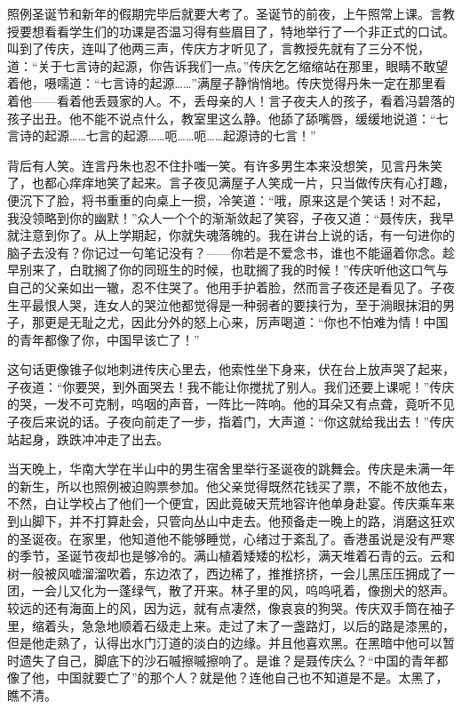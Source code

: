 \documentclass[UTF8]{ctexart}
\begin{document}
照例圣诞节和新年的假期完毕后就要大考了。圣诞节的前夜，上午照常上课。言教授要想看看学生们的功课是否温习得有些眉目了，特地举行了一个非正式的口试。叫到了传庆，连叫了他两三声，传庆方才听见了，言教授先就有了三分不悦，道：“关于七言诗的起源，你告诉我们一点。”传庆乞乞缩缩站在那里，眼睛不敢望着他，嗫嚅道：“七言诗的起源……”满屋子静悄悄地。传庆觉得丹朱一定在那里看着他——看着他丢聂家的人。不，丢母亲的人！言子夜夫人的孩子，看着冯碧落的孩子出丑。他不能不说点什么，教室里这么静。他舔了舔嘴唇，缓缓地说道：“七言诗的起源……七言的起源……呃……呃……起源诗的七言！”

背后有人笑。连言丹朱也忍不住扑嗤一笑。有许多男生本来没想笑，见言丹朱笑了，也都心痒痒地笑了起来。言子夜见满屋子人笑成一片，只当做传庆有心打趣，便沉下了脸，将书重重的向桌上一掼，冷笑道：“哦，原来这是个笑话！对不起，我没领略到你的幽默！”众人一个个的渐渐敛起了笑容，子夜又道：“聂传庆，我早就注意到你了。从上学期起，你就失魂落魄的。我在讲台上说的话，有一句进你的脑子去没有？你记过一句笔记没有？——你若是不爱念书，谁也不能逼着你念。趁早别来了，白耽搁了你的同班生的时候，也耽搁了我的时候！”传庆听他这口气与自己的父亲如出一辙，忍不住哭了。他用手护着脸，然而言子夜还是看见了。子夜生平最恨人哭，连女人的哭泣他都觉得是一种弱者的要挟行为，至于淌眼抹泪的男子，那更是无耻之尤，因此分外的怒上心来，厉声喝道：“你也不怕难为情！中国的青年都像了你，中国早该亡了！”

这句话更像锥子似地刺进传庆心里去，他索性坐下身来，伏在台上放声哭了起来，子夜道：“你要哭，到外面哭去！我不能让你搅扰了别人。我们还要上课呢！”传庆的哭，一发不可克制，呜咽的声音，一阵比一阵响。他的耳朵又有点聋，竟听不见子夜后来说的话。子夜向前走了一步，指着门，大声道：“你这就给我出去！”传庆站起身，跌跌冲冲走了出去。

当天晚上，华南大学在半山中的男生宿舍里举行圣诞夜的跳舞会。传庆是未满一年的新生，所以也照例被迫购票参加。他父亲觉得既然花钱买了票，不能不放他去，不然，白让学校占了他们一个便宜，因此竟破天荒地容许他单身赴宴。传庆乘车来到山脚下，并不打算赴会，只管向丛山中走去。他预备走一晚上的路，消磨这狂欢的圣诞夜。在家里，他知道他不能够睡觉，心绪过于紊乱了。香港虽说是没有严寒的季节，圣诞节夜却也是够冷的。满山植着矮矮的松杉，满天堆着石青的云。云和树一般被风嘘溜溜吹着，东边浓了，西边稀了，推推挤挤，一会儿黑压压拥成了一团，一会儿又化为一蓬绿气，散了开来。林子里的风，呜呜吼着，像捌犬的怒声。较远的还有海面上的风，因为远，就有点凄然，像哀哀的狗哭。传庆双手筒在袖子里，缩着头，急急地顺着石级走上来。走过了末了一盏路灯，以后的路是漆黑的，但是他走熟了，认得出水门汀道的淡白的边缘。并且他喜欢黑。在黑暗中他可以暂时遗失了自己，脚底下的沙石嘁擦嘁擦响了。是谁？是聂传庆么？“中国的青年都像了他，中国就要亡了”的那个人？就是他？连他自己也不知道是不是。太黑了，瞧不清。
\end{document}
